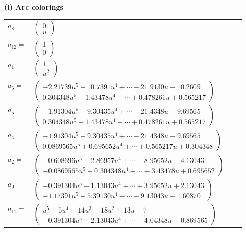 \documentclass[1p]{elsarticle_modified}
\theoremstyle{definition}
\begin{document}
\flushleft \textbf{(i) Arc colorings}\\
\begin{tabular}{m{7pt} m{180pt} m{7pt} m{180pt} }
\flushright $a_{8}=$&$\begin{pmatrix}0\\u\end{pmatrix}$ \\
\flushright $a_{12}=$&$\begin{pmatrix}1\\0\end{pmatrix}$ \\
\flushright $a_{1}=$&$\begin{pmatrix}1\\u^2\end{pmatrix}$ \\
\flushright $a_{6}=$&$\begin{pmatrix}-2.21739 u^{5}-10.7391 u^{4}+\cdots-21.9130 u-10.2609\\0.304348 u^{5}+1.43478 u^{4}+\cdots+0.478261 u+0.565217\end{pmatrix}$ \\
\flushright $a_{5}=$&$\begin{pmatrix}-1.91304 u^{5}-9.30435 u^{4}+\cdots-21.4348 u-9.69565\\0.304348 u^{5}+1.43478 u^{4}+\cdots+0.478261 u+0.565217\end{pmatrix}$ \\
\flushright $a_{4}=$&$\begin{pmatrix}-1.91304 u^{5}-9.30435 u^{4}+\cdots-21.4348 u-9.69565\\0.0869565 u^{5}+0.695652 u^{4}+\cdots+0.565217 u+0.304348\end{pmatrix}$ \\
\flushright $a_{2}=$&$\begin{pmatrix}-0.608696 u^{5}-2.86957 u^{4}+\cdots-8.95652 u-4.13043\\-0.0869565 u^{5}+0.304348 u^{4}+\cdots+3.43478 u+0.695652\end{pmatrix}$ \\
\flushright $a_{9}=$&$\begin{pmatrix}-0.391304 u^{5}-1.13043 u^{4}+\cdots+3.95652 u+2.13043\\-1.17391 u^{5}-5.39130 u^{4}+\cdots-9.13043 u-1.60870\end{pmatrix}$ \\
\flushright $a_{11}=$&$\begin{pmatrix}u^5+5 u^4+14 u^3+18 u^2+13 u+7\\-0.391304 u^{5}-2.13043 u^{4}+\cdots-4.04348 u-0.869565\end{pmatrix}$ \\

\end{tabular}
\end{document}
